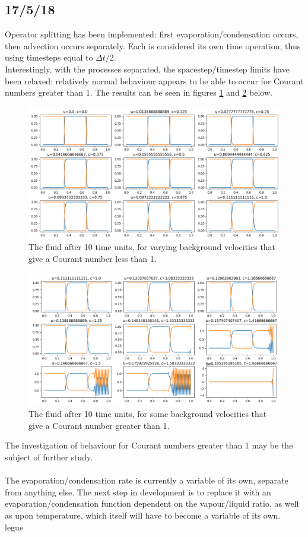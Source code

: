 \documentclass[11pt]{article}
\begin{document}
\subsection{17/5/18}
Operator splitting has been implemented: first evaporation/condensation occurs, then advection occurs separately. Each is considered its own time operation, thus using timesteps equal to $\Delta t/2$.\\
Interestingly, with the processes separated, the spacestep/timestep limits have been relaxed: relatively normal behaviour appears to be able to occur for Courant numbers greater than 1. The results can be seen in figures \ref{fig:eleventh} and \ref{fig:twelfth} below.
\begin{figure}[H]
\centering
\includegraphics[width=\textwidth]{eleventh}
\caption{The fluid after 10 time units, for varying background velocities that give a Courant number less than 1.}
\label{fig:eleventh}
\end{figure}
\begin{figure}[H]
\centering
\includegraphics[width=\textwidth]{twelfth}
\caption{The fluid after 10 time units, for some background velocities that give a Courant number greater than 1.}
\label{fig:twelfth}
\end{figure}
\noindent The investigation of behaviour for Courant numbers greater than 1 may be the subject of further study. \\
~\\
The evaporation/condensation rate is currently a variable of its own, separate from anything else. The next step in development is to replace it with an evaporation/condensation function dependent on the vapour/liquid ratio, as well as upon temperature, which itself will have to become a variable of its own. \\
legue %
\end{document}
